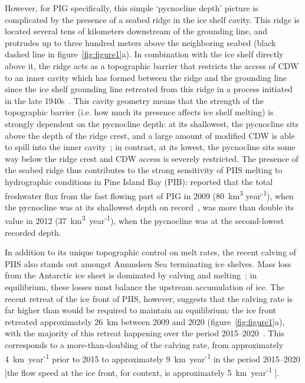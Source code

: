 \documentclass[draft]{agujournal2019}
\begin{document}
However, for PIG specifically, this simple `pycnocline depth' picture is complicated by the presence of a seabed ridge in the ice shelf cavity. This ridge is located several tens of kilometers downstream of the grounding line, and protrudes up to three hundred meters above the neighboring seabed (black dashed line in figure~\ref{fig:figure1}a). In combination with the ice shelf directly above it, the ridge acts as a topographic barrier that restricts the access of CDW to an inner cavity which has formed between the ridge and the grounding line since the ice shelf grounding line retreated from this ridge in a process initiated in the late 1940s~\cite{Jenkins2010NatureGeo, DeRydt2014JGeophysResOceans, DeRydt2016JGeophysResEarthSurf, Smith2017Nature}. This cavity geometry means that the strength of the topographic barrier (i.e. how much its presence affects ice shelf melting) is strongly dependent on the pycnocline depth: at its shallowest, the pycnocline sits above the depth of the ridge crest, and a large amount of modified CDW is able to spill into the inner cavity~\cite{Dutrieux2014Science}; in contrast, at its lowest, the pycnocline sits some way below the ridge crest and CDW access is severely restricted.  The presence of the seabed ridge thus contributes to the strong sensitivity of PIIS melting to hydrographic conditions in Pine Island Bay (PIB):  reported that the total freshwater flux from the fast flowing part of PIG in 2009 (80~km\textsuperscript{3} year\textsuperscript{-1}), when the pycnocline was at its shallowest depth on record~\cite{Webber2017NatureComms}, was more than double its value in 2012 (37~km\textsuperscript{3}~year\textsuperscript{-1}), when the pycnocline was at the second-lowest recorded depth.

In addition to its unique topographic control on melt rates, the recent calving of PIIS also stands out amongst Amundsen Sea terminating ice shelves. Mass loss from the Antarctic ice sheet is dominated by calving and melting~\cite{Rignot2013Science}; in equilibrium, these losses must balance the upstream accumulation of ice. The recent retreat of the ice front of PIIS, however, suggests that the calving rate is far higher than would be required to maintain an equilibrium: the ice front retreated approximately 26 km between 2009 and 2020 (figure~\ref{fig:figure1}a), with the majority of this retreat happening over the period 2015--2020~\cite{Lhermitte2020PNAS, Joughin2021ScienceAdv}. This corresponds to a more-than-doubling of the calving rate, from approximately 4~km~year\textsuperscript{-1} prior to 2015 to approximately 9~km~year\textsuperscript{-1} in the period 2015--2020 [the flow speed at the ice front, for context, is approximately 5~km~year\textsuperscript{-1} \cite{Joughin2021ScienceAdv}].
\end{document}
